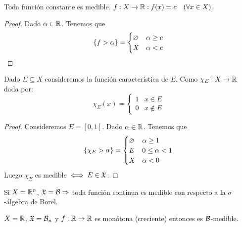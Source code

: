 \begin{eg}
    Toda función constante es medible. $f: X \to \mathbb{R} : f(x) = c \quad (\forall x \in X)$.
    \begin{proof}
        Dado $\alpha \in \mathbb{R}$. Tenemos que \begin{equation*}
            \{ f > \alpha \} = \begin{cases}
                \varnothing & \alpha \geq c \\
                X  & \alpha < c
            \end{cases}
        \end{equation*}
    \end{proof}
\end{eg}

\begin{eg}
    Dado $E \subseteq X$ consideremos la función característica de $E$. Como $\chi_E: X \to \mathbb{R}$ dada por:
    \begin{equation*}
        \chi_E(x) = \begin{cases}
            1 & x \in E    \\
            0 & x \notin E
        \end{cases}
    \end{equation*}
    \begin{proof}
        Consideremos $E = [0, 1]$. Dado $\alpha \in \mathbb{R}$. Tenemos que \begin{equation*}
            \{ \chi_E > \alpha \} = \begin{cases}
                \varnothing & \alpha \geq 1     \\
                E  & 0 \leq \alpha < 1 \\
                X  & \alpha < 0
            \end{cases}
        \end{equation*}
        Luego $\chi_E$ es medible $\iff E \in \mathfrak{X}$.
    \end{proof}
\end{eg}

\begin{eg}
    Si $X = \mathbb{R}^n$, $\mathfrak{X} = \mathcal{B} \Rightarrow$ toda función continua es medible con respecto a la $\sigma$-álgebra de Borel.
\end{eg}

\begin{eg}
    $X = \mathbb{R}$, $\mathfrak{X} = \mathcal{B}_n$ y $f: \mathbb{R} \to \mathbb{R}$ es monótona (creciente) entonces es $\mathcal{B}$-medible.
\end{eg}

